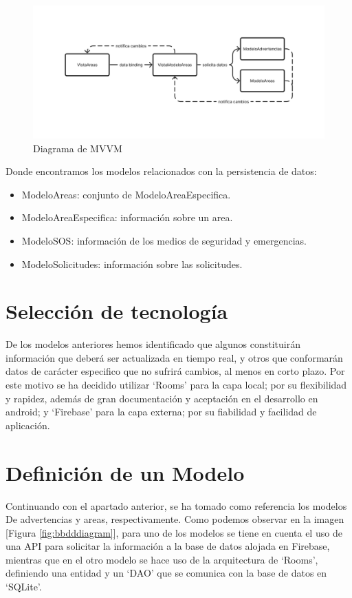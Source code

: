 \documentclass{article}
\begin{document}
    \begin{figure}[H]
        \centerline{\includegraphics[scale=0.4]{areasdiagram}}
        \caption{Diagrama de MVVM}
        \label{fig:areasdiagram}
    \end{figure}
    
    Donde encontramos los modelos relacionados con la persistencia de datos:

    \begin{itemize}
        \item ModeloAreas: conjunto de ModeloAreaEspecifica.
        \item ModeloAreaEspecifica: información sobre un area.
        \item ModeloSOS: información de los medios de seguridad y emergencias.
        \item ModeloSolicitudes: información sobre las solicitudes.
    \end{itemize}
    
        
    \section{Selección de tecnología}
    De los modelos anteriores hemos identificado que algunos constituirán
     información que deberá ser actualizada en tiempo real, y otros que conformarán
     datos de carácter especifico que no sufrirá cambios, al menos en corto plazo.
     Por este motivo se ha decidido utilizar \enquote*{Rooms} \cite[Rooms]{RoomsVSSQLite}
     para la capa local; por su flexibilidad y rapidez, además de gran documentación y
     aceptación en el desarrollo en android; y \enquote*{Firebase} para la capa externa;
     por su fiabilidad y facilidad de aplicación.
    
    \section{Definición de un Modelo}
    Continuando con el apartado anterior, se ha tomado como referencia los modelos De
     advertencias y areas, respectivamente. Como podemos observar en la imagen
     [Figura \ref{fig:bbdddiagram}], para uno de los modelos se tiene en cuenta el uso
     de una API para solicitar la información a la base de datos alojada en Firebase,
     mientras que en el otro modelo se hace uso de la arquitectura de \enquote*{Rooms},
     definiendo una entidad y un \enquote*{DAO} que se comunica con la base de datos en
     \enquote*{SQLite}.
\end{document}
